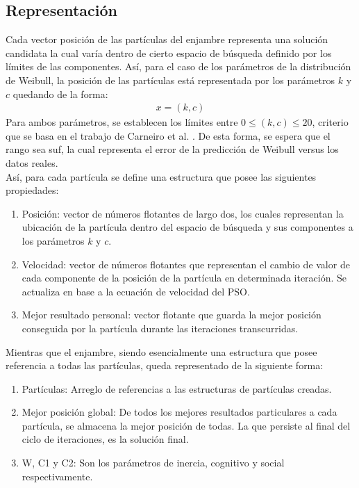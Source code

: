 \subsection{Representación}
Cada vector posición de las partículas del enjambre representa una solución candidata la cual varía dentro de cierto espacio de búsqueda definido por los límites de las componentes. Así, para el caso de los parámetros de la distribución de Weibull, la posición de las partículas está representada por los parámetros $k$ y $c$ quedando de la forma:
\begin{align}
    x = (k, c)
\end{align}    
Para ambos parámetros, se establecen los límites entre $0 \leq (k,c) \leq 20$, criterio que se basa en el trabajo de Carneiro et al. \cite{Carneiro15}. De esta forma, se espera que el rango sea suf, la cual representa el error de la predicción de Weibull versus los datos reales.\\
Así, para cada partícula se define una estructura que posee las siguientes propiedades: 
\begin{enumerate}\label{rep:Particle}
    \item Posición: vector de números flotantes de largo dos, los cuales representan la ubicación de la partícula dentro del espacio de búsqueda y sus componentes a los parámetros $k$ y $c$.
    \item Velocidad: vector de números flotantes que representan el cambio de valor de cada componente de la posición de la partícula en determinada iteración. Se actualiza en base a la ecuación de velocidad del PSO.
    \item Mejor resultado personal: vector flotante que guarda la mejor posición conseguida por la partícula durante las iteraciones transcurridas.    
\end{enumerate}        
Mientras que el enjambre, siendo esencialmente una estructura que posee referencia a todas las partículas, queda representado de la siguiente forma:
\begin{enumerate}\label{rep:Swarm}
    \item Partículas: Arreglo de referencias a las estructuras de partículas creadas.
    \item Mejor posición global: De todos los mejores resultados particulares a cada partícula, se almacena la mejor posición de todas. La que persiste al final del ciclo de iteraciones, es la solución final.
    \item W, C1 y C2: Son los parámetros de inercia, cognitivo y social respectivamente.    
\end{enumerate} 

